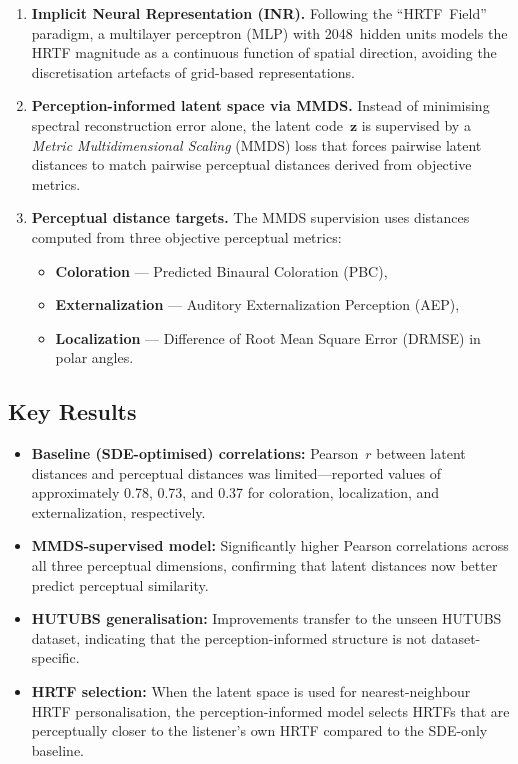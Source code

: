 \documentclass[12pt,a4paper]{article}
\begin{document}
\begin{enumerate}
  \item \textbf{Implicit Neural Representation (INR).}
        Following the ``HRTF~Field'' paradigm, a multilayer perceptron (MLP)
        with 2048~hidden units models the HRTF magnitude as a continuous
        function of spatial direction, avoiding the discretisation artefacts
        of grid-based representations.

  \item \textbf{Perception-informed latent space via MMDS.}
        Instead of minimising spectral reconstruction error alone, the
        latent code~$\mathbf{z}$ is supervised by a
        \emph{Metric Multidimensional Scaling} (MMDS) loss that forces
        pairwise latent distances to match pairwise perceptual distances
        derived from objective metrics.

  \item \textbf{Perceptual distance targets.}
        The MMDS supervision uses distances computed from three objective
        perceptual metrics:
        \begin{itemize}
          \item \textbf{Coloration} --- Predicted Binaural Coloration (PBC),
          \item \textbf{Externalization} --- Auditory Externalization
                Perception (AEP),
          \item \textbf{Localization} --- Difference of Root Mean Square
                Error (DRMSE) in polar angles.
        \end{itemize}
\end{enumerate}

\subsection{Key Results}

\begin{itemize}
  \item \textbf{Baseline (SDE-optimised) correlations:}
        Pearson~$r$ between latent distances and perceptual distances was
        limited---reported values of approximately 0.78, 0.73, and
        0.37 for coloration, localization, and externalization,
        respectively.
  \item \textbf{MMDS-supervised model:}
        Significantly higher Pearson correlations across all three
        perceptual dimensions, confirming that latent distances now
        better predict perceptual similarity.
  \item \textbf{HUTUBS generalisation:}
        Improvements transfer to the unseen HUTUBS dataset, indicating
        that the perception-informed structure is not dataset-specific.
  \item \textbf{HRTF selection:}
        When the latent space is used for nearest-neighbour HRTF
        personalisation, the perception-informed model selects HRTFs that
        are perceptually closer to the listener's own HRTF compared to the
        SDE-only baseline.
\end{itemize}
\end{document}
